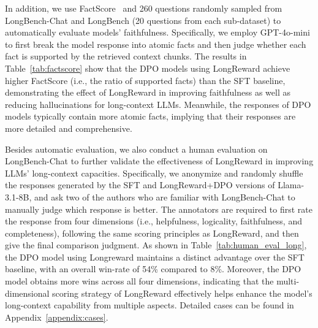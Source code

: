 In addition, we use FactScore~\cite{factscore} and 260 questions randomly sampled from LongBench-Chat and LongBench (20 questions from each sub-dataset) to automatically evaluate models' faithfulness. Specifically, we employ GPT-4o-mini to first break the model response into atomic facts and then judge whether each fact is supported by the retrieved context chunks. The results in Table~\ref{tab:factscore} show that the DPO models using LongReward achieve higher FactScore (i.e., the ratio of supported facts) than the SFT baseline, demonstrating the effect of LongReward in improving faithfulness as well as reducing hallucinations for long-context LLMs. Meanwhile, the responses of DPO models typically contain more atomic facts, implying that their responses are more detailed and comprehensive.

Besides automatic evaluation, we also conduct a human evaluation on LongBench-Chat to further validate the effectiveness of LongReward in improving LLMs' long-context capacities. Specifically, we anonymize and randomly shuffle the responses generated by the SFT and LongReward+DPO versions of Llama-3.1-8B, and ask two of the authors who are familiar with LongBench-Chat to manually judge which response is better. The annotators are required to first rate the response from four dimensions (i.e., helpfulness, logicality, faithfulness, and completeness), following the same scoring principles as LongReward, and then give the final comparison judgment. As shown in Table~\ref{tab:human_eval_long}, the DPO model using Longreward maintains a distinct advantage over the SFT baseline, with an overall win-rate of 54\% compared to 8\%. Moreover, the DPO model obtains more wins across all four dimensions, indicating that the multi-dimensional scoring strategy of LongReward effectively helps enhance the model's long-context capability from multiple aspects. Detailed cases can be found in Appendix~\ref{appendix:cases}.

